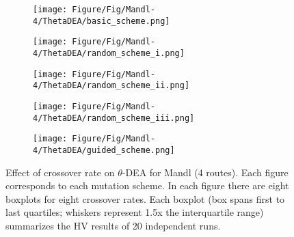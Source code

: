 \begin{figure}[!htbp]
	\centering
	\begin{subfigure}[b]{0.52\textwidth}
		\texttt{[image: Figure/Fig/Mandl-4/ThetaDEA/basic\_scheme.png]}
	\end{subfigure}%
	\begin{subfigure}[b]{0.52\textwidth}
		\texttt{[image: Figure/Fig/Mandl-4/ThetaDEA/random\_scheme\_i.png]}
	\end{subfigure}%
	\newline
	\begin{subfigure}[b]{0.52\textwidth}
		\texttt{[image: Figure/Fig/Mandl-4/ThetaDEA/random\_scheme\_ii.png]}
	\end{subfigure}%
	\begin{subfigure}[b]{0.52\textwidth}
		\texttt{[image: Figure/Fig/Mandl-4/ThetaDEA/random\_scheme\_iii.png]}
	\end{subfigure}%
	\newline
	\begin{subfigure}[b]{0.52\textwidth}
		\texttt{[image: Figure/Fig/Mandl-4/ThetaDEA/guided\_scheme.png]}
	\end{subfigure}%
	\caption{Effect of crossover rate on $\theta$-DEA for Mandl (4 routes). Each figure corresponds to each mutation scheme. In each figure there are eight boxplots for eight crossover rates.  Each boxplot (box spans first to last quartiles; whiskers represent 1.5x the interquartile range) summarizes the HV results of 20 independent runs.}
	\label{fig:cr_mandl4_thetadea}
\end{figure}


